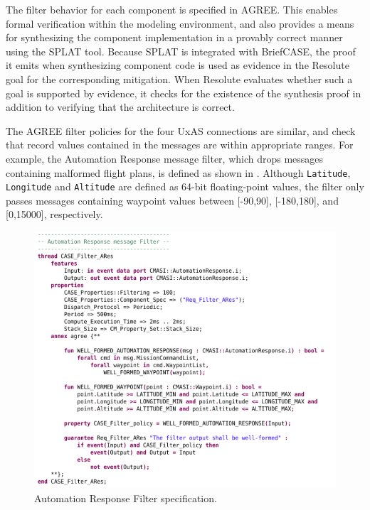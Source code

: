 The filter behavior for each component is specified in AGREE.  This enables formal verification within the modeling environment, and also provides a means for synthesizing the component implementation in a provably correct manner using the SPLAT tool.  Because SPLAT is integrated with BriefCASE, the proof it emits when synthesizing component code is used as evidence in the Resolute goal for the corresponding mitigation.  When Resolute evaluates whether such a goal is supported by evidence, it checks for the existence of the synthesis proof in addition to verifying that the architecture is correct.  

The AGREE filter policies for the four UxAS connections are similar, and check that record values contained in the messages are within appropriate ranges.  For example, the Automation Response message filter, which drops messages containing malformed flight plans, is defined as shown in .  Although \texttt{Latitude}, \texttt{Longitude} and \texttt{Altitude} are defined as 64-bit floating-point values, the filter only passes messages containing waypoint values between [-90,90], [-180,180], and [0,15000], respectively. 

\begin{figure}[h]
	\centering
	\includegraphics[width=1\columnwidth]{figs/automation-response-filter.png}
	\caption{Automation Response Filter specification.} 
	\label{fig:automation-response-filter} 
\end{figure}

